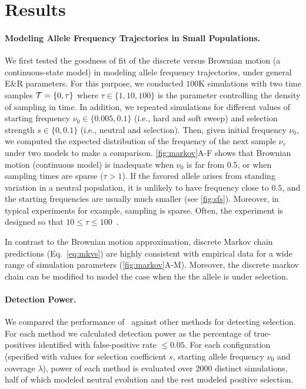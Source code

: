 \section{Results}
\paragraph{Modeling Allele Frequency Trajectories in Small Populations.} 
We first tested the goodness of fit of the discrete versus Brownian motion (a 
continuous-state model) in modeling allele frequency trajectories, under 
general E\&R
parameters.  For this purpose, we conducted $100$K simulations with
two time samples ${\cal T}=\{0,\tau\}$ where $\tau\in \{1,10,100\}$ is the
parameter controlling the density of sampling in time.  In addition,
we repeated simulations for different values of starting frequency
$\nu_0\in\{0.005,0.1\}$ (i.e., hard and soft sweep) and selection
strength $s\in\{0,0.1\}$ (i.e., neutral and selection). Then, given
initial frequency $\nu_0$, we computed the expected distribution of
the frequency of the next sample $\nu_\tau$ under two models to make a
comparison.  \ref{fig:markov}A-F shows that Brownian motion
(continuous model) is inadequate when $\nu_0$ is far from $0.5$, or
when sampling times are sparse ($\tau>1$). If the favored allele
arises from standing variation in a neutral population, it is unlikely
to have frequency close to $0.5$, and the starting frequencies are
usually much smaller (see \ref{fig:sfs}). Moreover, in typical \dmel
experiments for example, sampling is sparse. Often, the experiment is
designed so that $10\le\tau\le100$~\cite{kofler2013guide,
  orozco2012adaptation, zhou2011experimental,franssen2015patterns}.

In contrast to the Brownian motion approximation, discrete Markov
chain predictions (Eq.~\ref{eq:mkvs}) are highly consistent with
empirical data for a wide range of simulation parameters
(\ref{fig:markov}A-M). Moreover, the discrete markov chain can be
modified to model the case when the the allele is under
selection. 

\paragraph{Detection Power.} 
We compared the performance of \comale\ against other methods for
detecting selection. For each method we calculated detection power as
the percentage of true-positives identified with false-positive rate
$\le 0.05$. For each configuration (specified with values for
selection coefficient $s$, starting allele frequency $\nu_0$ and
coverage $\lambda$), power of each method is evaluated over $2000$
distinct simulations, half of which modeled neutral evolution and the
rest modeled positive selection.



